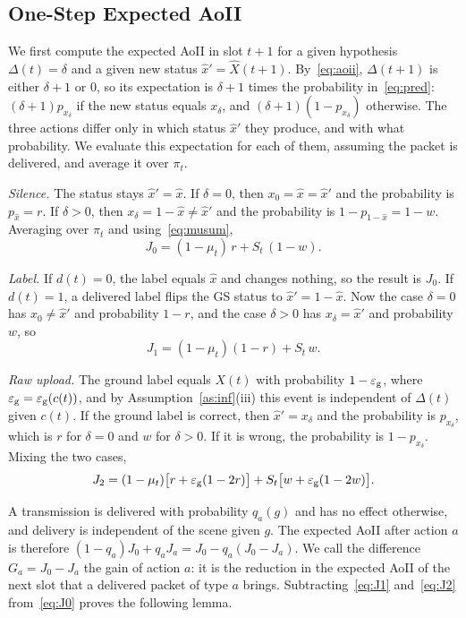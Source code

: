 \documentclass[journal]{IEEEtran}
\theoremstyle{remark}
\newcommand{\ee}{\varepsilon}
\newcommand{\xh}{\hat{x}}
\begin{document}
\subsection{One-Step Expected AoII}
We first compute the expected AoII in slot $t+1$ for a given hypothesis $\Delta(t)=\delta$ and a given new status $\xh'=\hat X(t+1)$. By~\eqref{eq:aoii}, $\Delta(t+1)$ is either $\delta+1$ or $0$, so its expectation is $\delta+1$ times the probability in~\eqref{eq:pred}: $(\delta+1)p_{x_\delta}$ if the new status equals $x_\delta$, and $(\delta+1)(1-p_{x_\delta})$ otherwise. The three actions differ only in which status $\xh'$ they produce, and with what probability. We evaluate this expectation for each of them, assuming the packet is delivered, and average it over $\pi_t$.

\emph{Silence.} The status stays $\xh'=\xh$. If $\delta=0$, then $x_0=\xh=\xh'$ and the probability is $p_{\xh}=r$. If $\delta>0$, then $x_\delta=1-\xh\neq\xh'$ and the probability is $1-p_{1-\xh}=1-w$. Averaging over $\pi_t$ and using~\eqref{eq:musum},
\begin{equation}\label{eq:J0}
J_0=(1-\mu_t)\,r+S_t\,(1-w).
\end{equation}

\emph{Label.} If $d(t)=0$, the label equals $\xh$ and changes nothing, so the result is $J_0$. If $d(t)=1$, a delivered label flips the GS status to $\xh'=1-\xh$. Now the case $\delta=0$ has $x_0\neq\xh'$ and probability $1-r$, and the case $\delta>0$ has $x_\delta=\xh'$ and probability $w$, so
\begin{equation}\label{eq:J1}
J_1=(1-\mu_t)(1-r)+S_t\,w.
\end{equation}

\emph{Raw upload.} The ground label equals $X(t)$ with probability $1-\ee_{\rm g}$, where $\ee_{\rm g}=\ee_{\rm g}(c(t))$, and by Assumption~\ref{as:inf}(iii) this event is independent of $\Delta(t)$ given $c(t)$. If the ground label is correct, then $\xh'=x_\delta$ and the probability is $p_{x_\delta}$, which is $r$ for $\delta=0$ and $w$ for $\delta>0$. If it is wrong, the probability is $1-p_{x_\delta}$. Mixing the two cases,
\begin{equation}\label{eq:J2}
J_2=(1-\mu_t)\big[r+\ee_{\rm g}(1-2r)\big]+S_t\big[w+\ee_{\rm g}(1-2w)\big].
\end{equation}

A transmission is delivered with probability $q_a(g)$ and has no effect otherwise, and delivery is independent of the scene given $g$. The expected AoII after action $a$ is therefore $(1-q_a)J_0+q_aJ_a=J_0-q_a(J_0-J_a)$. We call the difference $G_a=J_0-J_a$ the gain of action $a$: it is the reduction in the expected AoII of the next slot that a delivered packet of type $a$ brings. Subtracting~\eqref{eq:J1} and~\eqref{eq:J2} from~\eqref{eq:J0} proves the following lemma.
\end{document}
